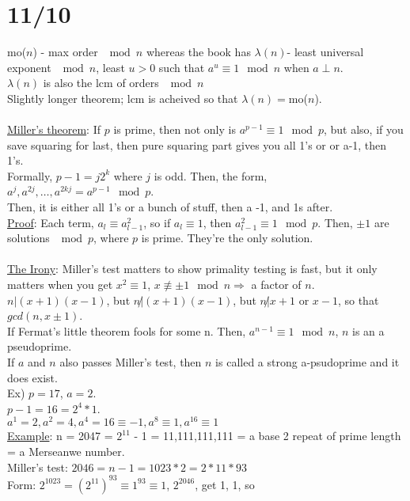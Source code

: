 \documentclass[13pt]{article}
\begin{document}
\section*{11/10}
	mo($n$) - max order $\mod n$ whereas the book has $\lambda(n)$- least
	universal exponent $\mod n$, least $u > 0$ such that $a^u \equiv 1 \mod n$
	when $a \perp n$.\\
	$\lambda(n)$ is also the lcm of orders $\mod n$\\
	Slightly longer theorem; lcm is acheived so that $\lambda(n) = $mo($n$).
	\\\\
	\underline{Miller's theorem}: If $p$ is prime, then not only is $a^{p-1}
	\equiv 1 \mod p$, but also, if you save squaring for last, then pure
	squaring part gives you all 1's or or a-1, then 1's.\\
	Formally, $p-1 = j2^k$ where $j$ is odd. Then, the form,
	$a^j, a^{2j}, \ldots, a^{2kj} = a^{p-1} \mod p$.\\
	Then, it is either all 1's or a bunch of stuff, then a -1, and 1s after.\\
	\underline{Proof}: Each term, $a_l \equiv a_{l-1}^2$, so if
	$a_l \equiv 1$, then $a_{l - 1}^2 \equiv 1 \mod p$. Then, $\pm 1$ are 
	solutions	$\mod p$, where $p$ is prime. They're the only solution.\\\\
	\underline{The Irony}: Miller's test matters to show primality testing is
	fast, but it only matters when you get $x^2 \equiv 1$, $x \not\equiv 
	\pm 1 \mod n \Rightarrow$ a factor of $n$.\\
	$n | (x+1)(x-1)$, but $n \not| (x+1)(x-1)$, but $n \not| x + 1$ or
	$x - 1$, so that $gcd(n, x \pm 1)$.\\
	If Fermat's little theorem fools for some n. Then, $a^{n-1} \equiv 1 \mod
	n$, $n$ is an a pseudoprime.\\
	If $a$ and $n$ also passes Miller's test, then $n$ is called a strong 
	a-psudoprime and it does exist.\\
	Ex) $p = 17$, $a = 2$.\\
	$p-1 = 16 = 2^4*1$.\\
	$a^1 = 2, a^2 = 4, a^4 = 16 \equiv -1, a^8 \equiv 1, a^{16} \equiv 1$\\
	\underline{Example}: n = 2047 = $2^{11}$ - 1 = 11,111,111,111 = a base 2
	repeat of prime length = a Merseanwe number.\\
	Miller's test: $2046 = n -1 = 1023*2 = 2*11*93$\\
	Form: $2^{1023} = (2^{11})^{93} \equiv 1^{93} \equiv 1$, $2^{2046}$, get 1, 1, so
\end{document}
